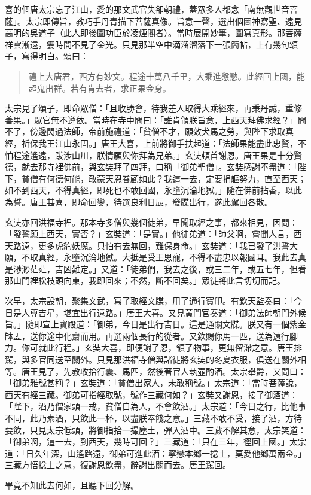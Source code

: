 喜的個唐太宗忘了江山，愛的那文武官失卻朝禮，蓋眾多人都念「南無觀世音菩薩」。太宗即傳旨，教巧手丹青描下菩薩真像。旨意一聲，選出個圖神寫聖、遠見高明的吳道子（此人即後圖功臣於凌煙閣者）。當時展開妙筆，圖寫真形。那菩薩祥雲漸遠，霎時間不見了金光。只見那半空中滴溜溜落下一張簡帖，上有幾句頌子，寫得明白。頌曰：
\begin{quote}
禮上大唐君，西方有妙文。程途十萬八千里，大乘進慇懃。此經回上國，能超鬼出群。若有肯去者，求正果金身。
\end{quote}

太宗見了頌子，即命眾僧：「且收勝會，待我差人取得大乘經來，再秉丹誠，重修善果。」眾官無不遵依。當時在寺中問曰：「誰肯領朕旨意，上西天拜佛求經？」問不了，傍邊閃過法師，帝前施禮道：「貧僧不才，願效犬馬之勞，與陛下求取真經，祈保我王江山永固。」唐王大喜，上前將御手扶起道：「法師果能盡此忠賢，不怕程途遙遠，跋涉山川，朕情願與你拜為兄弟。」玄奘頓首謝恩。唐王果是十分賢德，就去那寺裡佛前，與玄奘拜了四拜，口稱「御弟聖僧」。玄奘感謝不盡道：「陛下，貧僧有何德何能，敢蒙天恩眷顧如此？我這一去，定要捐軀努力，直至西天；如不到西天，不得真經，即死也不敢回國，永墮沉淪地獄。」隨在佛前拈香，以此為誓。唐王甚喜，即命回鑾，待選良利日辰，發牒出行，遂此駕回各散。

玄奘亦回洪福寺裡。那本寺多僧與幾個徒弟，早聞取經之事，都來相見，因問：「發誓願上西天，實否？」玄奘道：「是實。」他徒弟道：「師父啊，嘗聞人言，西天路遠，更多虎豹妖魔。只怕有去無回，難保身命。」玄奘道：「我已發了洪誓大願，不取真經，永墮沉淪地獄。大抵是受王恩寵，不得不盡忠以報國耳。我此去真是渺渺茫茫，吉凶難定。」又道：「徒弟們，我去之後，或三二年，或五七年，但看那山門裡松枝頭向東，我即回來；不然，斷不回矣。」眾徒將此言切切而記。

次早，太宗設朝，聚集文武，寫了取經文牒，用了通行寶印。有欽天監奏曰：「今日是人尊吉星，堪宜出行遠路。」唐王大喜。又見黃門官奏道：「御弟法師朝門外候旨。」隨即宣上寶殿道：「御弟，今日是出行吉日。這是通關文牒。朕又有一個紫金缽盂，送你途中化齋而用。再選兩個長行的從者。又欽賜你馬一匹，送為遠行腳力。你可就此行程。」玄奘大喜，即便謝了恩，領了物事，更無留滯之意。唐王排駕，與多官同送至關外。只見那洪福寺僧與諸徒將玄奘的冬夏衣服，俱送在關外相等。唐王見了，先教收拾行囊、馬匹，然後著官人執壺酌酒。太宗舉爵，又問曰：「御弟雅號甚稱？」玄奘道：「貧僧出家人，未敢稱號。」太宗道：「當時菩薩說，西天有經三藏。御弟可指經取號，號作三藏何如？」玄奘又謝恩，接了御酒道：「陛下，酒乃僧家頭一戒，貧僧自為人，不會飲酒。」太宗道：「今日之行，比他事不同，此乃素酒，只飲此一杯，以盡朕奉餞之意。」三藏不敢不受，接了酒，方待要飲，只見太宗低頭，將御指拾一撮塵土，彈入酒中。三藏不解其意，太宗笑道：「御弟啊，這一去，到西天，幾時可回？」三藏道：「只在三年，徑回上國。」太宗道：「日久年深，山遙路遠，御弟可進此酒：寧戀本鄉一捻土，莫愛他鄉萬兩金。」三藏方悟捻土之意，復謝恩飲盡，辭謝出關而去。唐王駕回。

畢竟不知此去何如，且聽下回分解。
